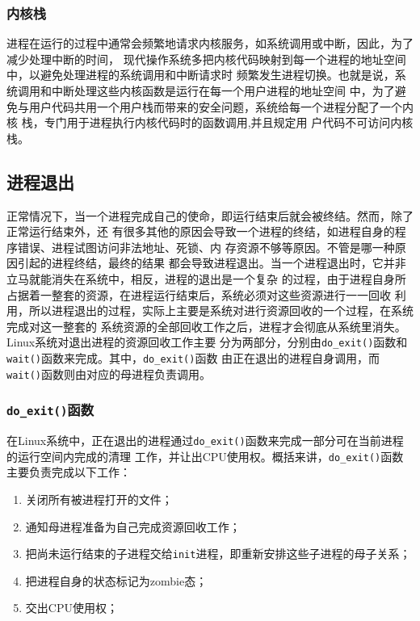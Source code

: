 \documentclass{swfuthesism}
\begin{document}
\subsubsection{内核栈}

进程在运行的过程中通常会频繁地请求内核服务，如系统调用或中断，因此，为了减少处理中断的时间，
现代操作系统多把内核代码映射到每一个进程的地址空间中，以避免处理进程的系统调用和中断请求时
频繁发生进程切换。也就是说，系统调用和中断处理这些内核函数是运行在每一个用户进程的地址空间
中，为了避免与用户代码共用一个用户栈而带来的安全问题，系统给每一个进程分配了一个内核
栈\cite{linuxq:kstack,stack:kernelstack3}，专门用于进程执行内核代码时的函数调用,并且规定用
户代码不可访问内核栈。

\subsection{进程退出}

正常情况下，当一个进程完成自己的使命，即运行结束后就会被终结。然而，除了正常运行结束外，还
有很多其他的原因会导致一个进程的终结，如进程自身的程序错误、进程试图访问非法地址、死锁、内
存资源不够等原因\cite{mauerer2008professional}。不管是哪一种原因引起的进程终结，最终的结果
都会导致进程退出。当一个进程退出时，它并非立马就能消失在系统中，相反，进程的退出是一个复杂
的过程，由于进程自身所占据着一整套的资源，在进程运行结束后，系统必须对这些资源进行一一回收
利用，所以进程退出的过程，实际上主要是系统对进行资源回收的一个过程，在系统完成对这一整套的
系统资源的全部回收工作之后，进程才会彻底从系统里消失。Linux系统对退出进程的资源回收工作主要
分为两部分，分别由\texttt{do\_exit()}函数和\texttt{wait()}函数来完成。其中，\texttt{do\_exit()}函数
由正在退出的进程自身调用，而\texttt{wait()}函数则由对应的母进程负责调用。

\subsubsection{\texttt{do\_exit()}函数}

在Linux系统中，正在退出的进程通过\texttt{do\_exit()}函数来完成一部分可在当前进程的运行空间内完成的清理
工作，并让出CPU使用权。概括来讲，\texttt{do\_exit()}函数主要负责完成以下工作：
\begin{enumerate}
\item 关闭所有被进程打开的文件；
\item 通知母进程准备为自己完成资源回收工作；
\item 把尚未运行结束的子进程交给\texttt{init}进程，即重新安排这些子进程的母子关系；
\item 把进程自身的状态标记为zombie态；
\item 交出CPU使用权；
\end{enumerate}
\end{document}
